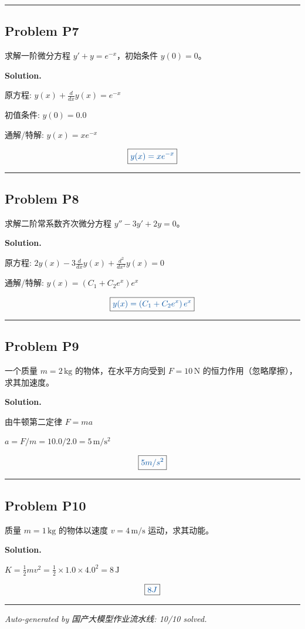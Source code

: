 \documentclass[11pt, a4paper]{ctexart}
\newcommand{\problem}[1]{\subsection*{Problem #1}}
\newcommand{\solution}{\par\noindent\textbf{Solution.}\par\smallskip}
\begin{document}
\vspace{0.6em}\hrule\vspace{0.6em}
\problem{P7}

求解一阶微分方程 $y' + y = e^{-x}$，初始条件 $y(0) = 0$。

\solution
原方程: $y{\left(x \right)} + \frac{d}{d x} y{\left(x \right)} = e^{- x}$

初值条件: $y{\left(0 \right)}=0.0$

通解/特解: $y{\left(x \right)} = x e^{- x}$

\[\boxed{\textcolor{anscolor}{y{\left(x \right)} = x e^{- x}}}\]

\vspace{0.6em}\hrule\vspace{0.6em}
\problem{P8}

求解二阶常系数齐次微分方程 $y'' - 3 y' + 2 y = 0$。

\solution
原方程: $2 y{\left(x \right)} - 3 \frac{d}{d x} y{\left(x \right)} + \frac{d^{2}}{d x^{2}} y{\left(x \right)} = 0$

通解/特解: $y{\left(x \right)} = \left(C_{1} + C_{2} e^{x}\right) e^{x}$

\[\boxed{\textcolor{anscolor}{y{\left(x \right)} = \left(C_{1} + C_{2} e^{x}\right) e^{x}}}\]

\vspace{0.6em}\hrule\vspace{0.6em}
\problem{P9}

一个质量 $m = 2\,\mathrm{kg}$ 的物体，在水平方向受到 $F = 10\,\mathrm{N}$ 的恒力作用（忽略摩擦），求其加速度。

\solution
由牛顿第二定律 $F = m a$

$a = F/m = 10.0/2.0 = 5\,\mathrm{m/s^2}$

\[\boxed{\textcolor{anscolor}{5 m/s^2}}\]

\vspace{0.6em}\hrule\vspace{0.6em}
\problem{P10}

质量 $m = 1\,\mathrm{kg}$ 的物体以速度 $v = 4\,\mathrm{m/s}$ 运动，求其动能。

\solution
$K = \frac{1}{2} m v^2 = \frac{1}{2}\times 1.0\times 4.0^2 = 8\,\mathrm{J}$

\[\boxed{\textcolor{anscolor}{8 J}}\]

\vspace{0.6em}\hrule\vspace{0.6em}
\vspace{1em}\noindent\textit{Auto-generated by 国产大模型作业流水线: 10/10 solved.}
\end{document}
